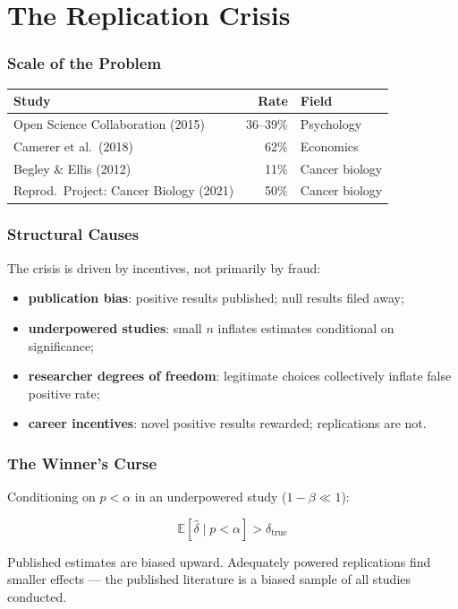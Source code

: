 \documentclass[]{beamer}
\begin{document}
\section{The Replication Crisis}

\begin{frame}[fragile]
\frametitle{Scale of the Problem}
{\footnotesize
\begin{tabular}{p{5.5cm} r p{3.5cm}}
\toprule
\textbf{Study} & \textbf{Rate} & \textbf{Field} \\
\midrule
Open Science Collaboration (2015) & 36–39\% & Psychology \\
Camerer et al.\ (2018) & 62\% & Economics \\
Begley \& Ellis (2012) & 11\% & Cancer biology \\
Reprod.\ Project: Cancer Biology (2021) & 50\% & Cancer biology \\
\bottomrule
\end{tabular}
}

\end{frame}

\begin{frame}[fragile]
\frametitle{Structural Causes}
The crisis is driven by incentives, not primarily by fraud:
\begin{itemize}
  \item \textbf{publication bias}: positive results published; null results filed away;
  \item \textbf{underpowered studies}: small $n$ inflates estimates conditional on significance;
  \item \textbf{researcher degrees of freedom}: legitimate choices collectively inflate false positive rate;
  \item \textbf{career incentives}: novel positive results rewarded; replications are not.
\end{itemize}

\end{frame}

\begin{frame}[fragile]
\frametitle{The Winner's Curse}
Conditioning on $p < \alpha$ in an underpowered study ($1 - \beta \ll 1$):

$$\mathbb{E}[\hat{\delta} \mid p < \alpha] > \delta_{\text{true}}$$

Published estimates are biased upward. Adequately powered replications find smaller effects — the published literature is a biased sample of all studies conducted.

\end{frame}
\end{document}
